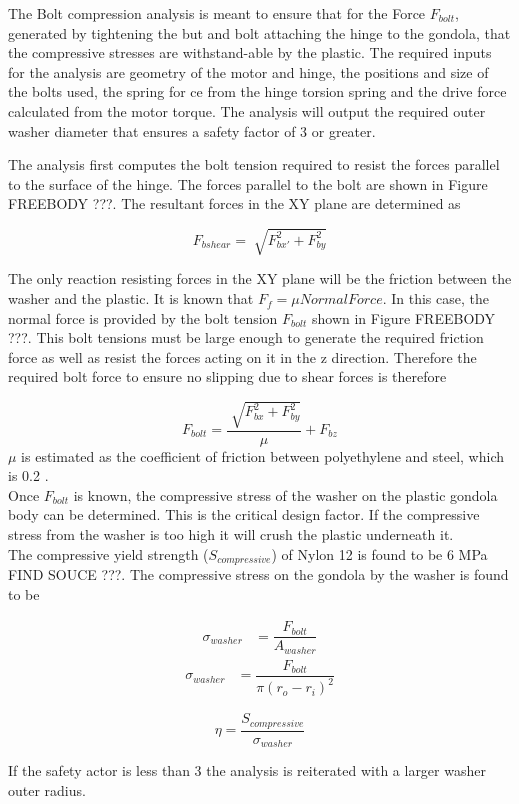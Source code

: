 \documentclass[../main.tex]{subfiles}
\begin{document}
The Bolt compression analysis is meant to ensure that for the Force $F_{bolt}$, generated by tightening the but and bolt attaching the hinge to the gondola, that the compressive stresses are withstand-able by the plastic. The required inputs for the analysis are geometry of the motor and hinge, the positions and size of the bolts used, the spring for ce from the hinge torsion spring and the drive force calculated from the motor torque. The analysis will output the required outer washer diameter that ensures a safety factor of 3 or greater. 
  
The analysis first computes the bolt tension required to resist the forces parallel to the surface of the hinge. The forces parallel to the bolt are shown in Figure FREEBODY ???. The resultant forces in the XY plane are determined as 

\begin{displaymath}
F_{bshear} = \sqrt[]{F_{bx'}^2 + F_{by}^2}
\end{displaymath}

The only reaction resisting forces in the XY plane will be the friction between the washer and the plastic. It is known that $F_f = \mu Normal Force$. In this case, the normal force is provided by the bolt tension $F_{bolt}$ shown in Figure FREEBODY ???. This bolt tensions must be large enough to generate the required friction force as well as resist the forces acting on it in the z direction. Therefore the required bolt force to ensure no slipping due to shear forces is therefore

\begin{equation}
F_{bolt} = \dfrac{\sqrt[]{F_{bx}^2 + F_{by}^2}}{\mu} + F_{bz}
\end{equation}
$\mu $ is estimated as the coefficient of friction between polyethylene and steel, which is 0.2 \cite{Friction}. \\

Once $F_{bolt}$ is known, the compressive stress of the washer on the plastic gondola body can be determined. This is the critical design factor. If the compressive stress from the washer is too high it will crush the plastic underneath it.\\

The compressive yield strength ($S_{compressive}$) of Nylon 12  is found to be 6 MPa FIND SOUCE ???. The compressive stress on the gondola by the washer is found to be 

\begin{align*}
\sigma _{washer} &= \dfrac{F_{bolt}}{A_{washer}}
\end{align*}
\begin{align}
\sigma _{washer} &= \dfrac{F_{bolt}}{\pi (r_o - r_i)^2}
\end{align}

\begin{equation}
\eta = \dfrac{S_{compressive}}{\sigma _{washer}}
\end{equation}

If the safety actor is less than 3 the analysis is reiterated with a larger washer outer radius. 
\end{document}
